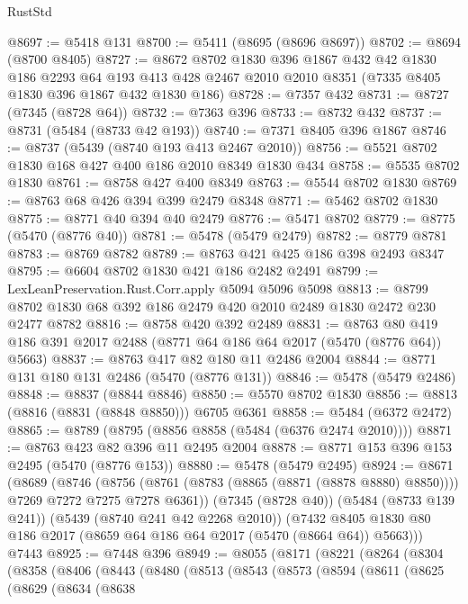 \begin{lexlean}{RustStd}
\begin{coremodule}
@8697 := @5418 @131
@8700 := @5411 (@8695 (@8696 @8697))
@8702 := @8694 (@8700 @8405)
@8727 := @8672
    @8702
    @1830
    @396
    @1867
    @432
    @42
    @1830
    @186
    @2293
    @64
    @193
    @413
    @428
    @2467
    @2010
    @2010
    @8351
    (@7335 @8405 @1830 @396 @1867 @432 @1830 @186)
@8728 := @7357 @432
@8731 := @8727 (@7345 (@8728 @64))
@8732 := @7363 @396
@8733 := @8732 @432
@8737 := @8731 (@5484 (@8733 @42 @193))
@8740 := @7371 @8405 @396 @1867
@8746 := @8737 (@5439 (@8740 @193 @413 @2467 @2010))
@8756 := @5521 @8702 @1830 @168 @427 @400 @186 @2010 @8349 @1830 @434
@8758 := @5535 @8702 @1830
@8761 := @8758 @427 @400 @8349
@8763 := @5544 @8702 @1830
@8769 := @8763 @68 @426 @394 @399 @2479 @8348
@8771 := @5462 @8702 @1830
@8775 := @8771 @40 @394 @40 @2479
@8776 := @5471 @8702
@8779 := @8775 (@5470 (@8776 @40))
@8781 := @5478 (@5479 @2479)
@8782 := @8779 @8781
@8783 := @8769 @8782
@8789 := @8763 @421 @425 @186 @398 @2493 @8347
@8795 := @6604 @8702 @1830 @421 @186 @2482 @2491
@8799 := LexLeanPreservation.Rust.Corr.apply @5094 @5096 @5098
@8813 := @8799 @8702 @1830 @68 @392 @186 @2479 @420 @2010 @2489 @1830 @2472 @230 @2477 @8782
@8816 := @8758 @420 @392 @2489
@8831 := @8763 @80 @419 @186 @391 @2017 @2488 (@8771 @64 @186 @64 @2017 (@5470 (@8776 @64)) @5663)
@8837 := @8763 @417 @82 @180 @11 @2486 @2004
@8844 := @8771 @131 @180 @131 @2486 (@5470 (@8776 @131))
@8846 := @5478 (@5479 @2486)
@8848 := @8837 (@8844 @8846)
@8850 := @5570 @8702 @1830
@8856 := @8813 (@8816 (@8831 (@8848 @8850))) @6705 @6361
@8858 := @5484 (@6372 @2472)
@8865 := @8789 (@8795 (@8856 @8858 (@5484 (@6376 @2474 @2010))))
@8871 := @8763 @423 @82 @396 @11 @2495 @2004
@8878 := @8771 @153 @396 @153 @2495 (@5470 (@8776 @153))
@8880 := @5478 (@5479 @2495)
@8924 := @8671
    (@8689
      (@8746
        (@8756 (@8761 (@8783 (@8865 (@8871 (@8878 @8880) @8850)))) @7269 @7272 @7275 @7278 @6361))
      (@7345 (@8728 @40))
      (@5484 (@8733 @139 @241))
      (@5439 (@8740 @241 @42 @2268 @2010))
      (@7432 @8405 @1830 @80 @186 @2017 (@8659 @64 @186 @64 @2017 (@5470 (@8664 @64)) @5663)))
    @7443
@8925 := @7448 @396
@8949 := @8055
    (@8171
      (@8221
        (@8264
          (@8304
            (@8358
              (@8406
                (@8443
                  (@8480
                    (@8513
                      (@8543
                        (@8573
                          (@8594
                            (@8611
                              (@8625
                                (@8629
                                  (@8634
                                    (@8638

\end{coremodule}
\end{lexlean}
